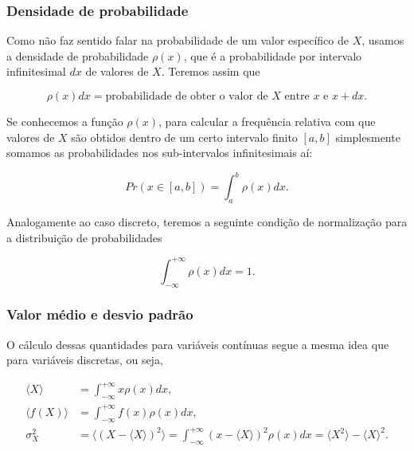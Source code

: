 \documentclass[11pt]{article}
\begin{document}
\subsubsection{Densidade de
probabilidade}\label{densidade-de-probabilidade}

Como não faz sentido falar na probabilidade de um valor específico de
\(X\), usamos a densidade de probabilidade \(\rho(x)\), que é a
probabilidade por intervalo infinitesimal \(dx\) de valores de \(X\).
Teremos assim que

\begin{equation}
\rho(x)dx = \text{probabilidade de obter o valor de } X \text{ entre } x \text{ e } x+dx.
\end{equation}

Se conhecemos a função \(\rho(x)\), para calcular a frequência relativa
com que valores de \(X\) são obtidos dentro de um certo intervalo finito
\([a,b]\) simplesmente somamos as probabilidades nos sub-intervalos
infinitesimais aí:

\begin{equation}
Pr(x\in[a,b]) = \int_{a}^{b} \rho(x)dx.
\end{equation}

Analogamente ao caso discreto, teremos a seguinte condição de
normalização para a distribuição de probabilidades

\begin{equation}
\int_{-\infty}^{+\infty} \rho(x)dx = 1.
\end{equation}

\subsubsection{Valor médio e desvio
padrão}\label{valor-muxe9dio-e-desvio-padruxe3o}

O cálculo dessas quantidades para variáveis contínuas segue a mesma idea
que para variáveis discretas, ou seja,

\begin{align}
\langle X \rangle & = \int_{-\infty}^{+\infty} x\rho(x)dx, \\
\langle f(X) \rangle & = \int_{-\infty}^{+\infty} f(x)\rho(x)dx, \\
\sigma_{X}^{2} & = \langle (X - \langle X \rangle)^{2} \rangle = \int_{-\infty}^{+\infty} (x - \langle X \rangle)^{2}\rho(x)dx = \langle X^{2} \rangle - \langle X \rangle^{2}. \\
\end{align}
\end{document}
